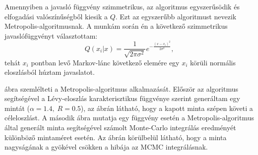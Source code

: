 \documentclass[11pt,a4paper]{article}
\numberwithin{equation}{subsection}
\numberwithin{figure}{section}
\begin{document}
Amennyiben a javasló függvény szimmetrikus, az algoritmus egyszerűsödik és ~ elfogadási valószínűségből kiesik a $Q$. Ezt az egyszerűbb algoritmust nevezik Metropolis-algoritmusnak. A munkám során én a következő szimmetrikus javaslófüggvényt választottam:
\begin{equation}
Q(x_i|x) = \frac{1}{\sqrt{2\pi\sigma^2}}e^{-\frac{(x-x_i)^2}{2\sigma^2}},
\end{equation}
tehát $x_i$ pontban levő Markov-lánc következő elemére egy $x_i$ körüli normális eloszlásból húztam javaslatot.

 ábra szemlélteti a Metropolis-algoritmus alkalmazását. Először az algoritmus segítségével a Lévy-eloszlás karakterisztikus függvénye szerint generáltam egy mintát ($\alpha=1.4,\;R=0.5$), az ábrán látható, hogy a kapott minta szépen követi a céleloszlást. A második ábra mutatja egy függvény esetén a Metropolis-algoritmus által generált minta segítségével számolt Monte-Carlo integrálás eredményét különböző mintaméret esetén. Az ábrán körülbelül látható, hogy a minta nagyságának a gyökével csökken a hibája az MCMC integrálásnak.
\end{document}
